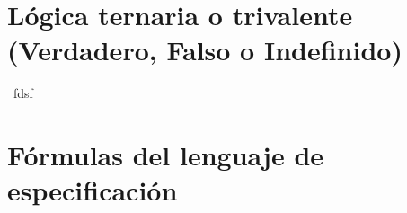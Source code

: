 \documentclass[12pt,a4paper,spanish]{article}
\begin{document}
\ejercicio

\section{Lógica ternaria o trivalente (Verdadero, Falso o Indefinido)}

\ejercicio\FiveStar\ 
fdsf
\ejercicio\FiveStar\ 
\ejercicio\FiveStar\ 
\ejercicio\FiveStar\ 
\ejercicio\FiveStar\ 

\ejercicio

\ejercicio

\section{Fórmulas del lenguaje de especificación}
\ejercicio\FiveStar\
\ejercicio


%
\end{document}
